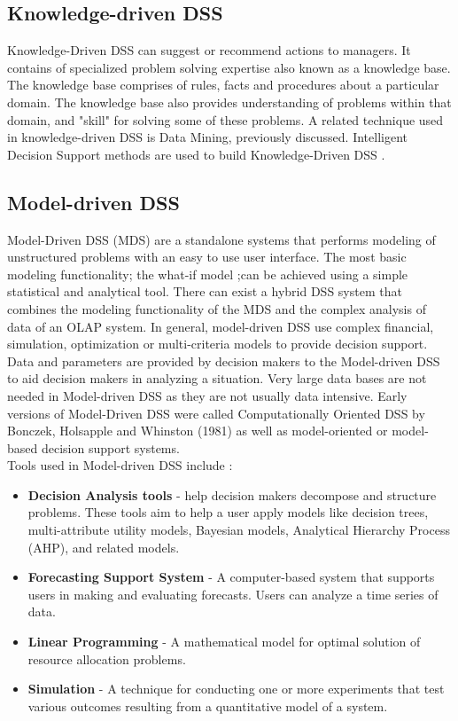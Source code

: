\subsection{Knowledge-driven DSS}
\label{subsec:KnowledgeDrivenDSS}
Knowledge-Driven DSS can suggest or recommend actions to managers. It contains of specialized problem solving expertise also known as a knowledge base. The knowledge base comprises of rules, facts and procedures about a particular domain. The knowledge base also provides understanding of problems within that domain, and "skill" for solving some of these problems. A related technique used in knowledge-driven DSS is Data Mining, previously discussed. Intelligent Decision Support methods are used to build Knowledge-Driven DSS  \cite{power2002building}.
\subsection{Model-driven DSS}
\label{subsec:ModelDrivenDSS}
Model-Driven DSS (MDS) are a standalone systems that performs modeling of unstructured problems with an easy to use user interface. The most basic modeling functionality; the what-if model ;can be achieved using a simple statistical and analytical tool. There can exist a hybrid DSS system that combines the modeling functionality of the MDS and the complex analysis of data of an OLAP system.\cite{DDSTypes} In general, model-driven DSS use complex financial, simulation, optimization or multi-criteria models to provide decision support.\cite{DDSTypes} Data and parameters are provided by decision makers to the Model-driven DSS to aid decision makers in analyzing a situation. Very large data bases are not needed in Model-driven DSS as they are not usually data intensive.\cite{DDSTypes} Early versions of Model-Driven DSS were called Computationally Oriented DSS by Bonczek, Holsapple and Whinston (1981) \cite{bonczek1981generalized,power2002building} as well as model-oriented or model-based decision support systems.\\
Tools used in Model-driven DSS include \cite{makowski2003modeling}:
\begin{itemize}
	\item \textbf{Decision Analysis tools} - help decision makers decompose and structure problems. These tools aim to help a user apply models like decision trees, multi-attribute utility models, Bayesian models, Analytical Hierarchy Process (AHP), and related models.\cite{DDSTypes}
	\item \textbf{Forecasting Support System} - A computer-based system that supports users in making and evaluating forecasts. Users can analyze a time series of data.\cite{DDSTypes}
	\item \textbf{Linear Programming} - A mathematical model for optimal solution of resource allocation problems.\cite{DDSTypes}
	\item \textbf{Simulation} - A technique for conducting one or more experiments that test various outcomes resulting from a quantitative model of a system.\cite{DDSTypes}
\end{itemize}
